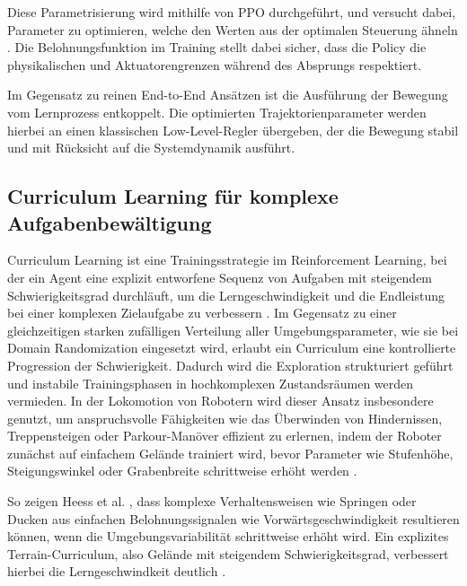 Diese Parametrisierung wird mithilfe von PPO durchgeführt, und versucht dabei, Parameter zu optimieren, welche den Werten aus der optimalen Steuerung ähneln \cite{bussolaGuidedReinforcementLearning2025}. %
Die Belohnungsfunktion im Training stellt dabei sicher, dass die Policy die physikalischen und Aktuatorengrenzen während des Absprungs respektiert.

Im Gegensatz zu reinen End-to-End Ansätzen ist die Ausführung der Bewegung vom Lernprozess entkoppelt. Die optimierten Trajektorienparameter werden hierbei an einen klassischen Low-Level-Regler übergeben, der die Bewegung stabil und mit Rücksicht auf die Systemdynamik ausführt.

\subsection{Curriculum Learning für komplexe Aufgabenbewältigung}
Curriculum Learning ist eine Trainingsstrategie im Reinforcement Learning, bei der ein Agent eine explizit entworfene Sequenz von Aufgaben mit steigendem Schwierigkeitsgrad durchläuft, um die Lerngeschwindigkeit und die Endleistung bei einer komplexen Zielaufgabe zu verbessern \cite{francois-lavetIntroductionDeepReinforcement2018, arulkumaranDRL2017}. Im Gegensatz zu einer gleichzeitigen starken zufälligen Verteilung aller Umgebungsparameter, wie sie bei Domain Randomization eingesetzt wird, erlaubt ein Curriculum eine kontrollierte Progression der Schwierigkeit. Dadurch wird die Exploration strukturiert geführt und instabile Trainingsphasen in hochkomplexen Zustandsräumen werden vermieden. In der Lokomotion von Robotern wird dieser Ansatz insbesondere genutzt, um anspruchsvolle Fähigkeiten wie das Überwinden von Hindernissen, Treppensteigen oder Parkour-Manöver effizient zu erlernen, indem der Roboter zunächst auf einfachem Gelände trainiert wird, bevor Parameter wie Stufenhöhe, Steigungswinkel oder Grabenbreite schrittweise erhöht werden \cite{heessEmergenceLocomotionBehaviours2017, rudin2022learningwalkminutesusing, hoellerANYmalParkourLearning2023, jinResilientLeggedLocal2023}.

So zeigen Heess et al. \cite{heessEmergenceLocomotionBehaviours2017}, dass komplexe Verhaltensweisen wie Springen oder Ducken aus einfachen Belohnungssignalen wie Vorwärtsgeschwindigkeit resultieren können, wenn die Umgebungsvariabilität schrittweise erhöht wird. Ein explizites Terrain-Curriculum, also Gelände mit steigendem Schwierigkeitsgrad, verbessert hierbei die Lerngeschwindkeit deutlich \cite{heessEmergenceLocomotionBehaviours2017}.

